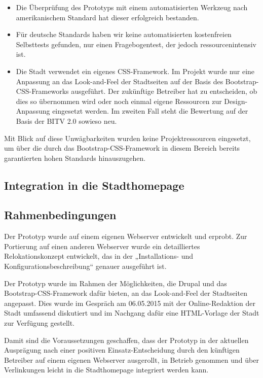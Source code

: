 \documentclass[11pt,a4paper,twoside]{article}
\begin{document}
\begin{itemize}\itemsep0pt
\item Die Überprüfung des Prototyps mit einem automatisierten Werkzeug nach
  amerikanischem Standard hat dieser erfolgreich bestanden.
\item Für deutsche Standards haben wir keine automatisierten kostenfreien
  Selbsttests gefunden, nur einen Fragebogentest, der jedoch
  ressourcenintensiv ist.
\item Die Stadt verwendet ein eigenes CSS-Framework. Im Projekt wurde nur eine
  Anpassung an das Look-and-Feel der Stadtseiten auf der Basis des
  Bootstrap-CSS-Frameworks ausgeführt.  Der zukünftige Betreiber hat zu
  entscheiden, ob dies so übernommen wird oder noch einmal eigene Ressourcen
  zur Design-Anpassung eingesetzt werden.  Im zweiten Fall steht die Bewertung
  auf der Basis der BITV 2.0 sowieso neu.
\end{itemize}
Mit Blick auf diese Unwägbarkeiten wurden keine Projektressourcen eingesetzt,
um über die durch das Bootstrap-CSS-Framework in diesem Bereich bereits
garantierten hohen Standards hinauszugehen.

\subsection{Integration in die Stadthomepage}

\subsection*{Rahmenbedingungen}

Der Prototyp wurde auf einem eigenen Webserver entwickelt und erprobt.  Zur
Portierung auf einen anderen Webserver wurde ein detailliertes
Relokationskonzept entwickelt, das in der „Installations- und
Konfigurationsbeschreibung“ genauer ausgeführt ist. 

Der Prototyp wurde im Rahmen der Möglichkeiten, die Drupal und das
Bootstrap-CSS-Framework dafür bieten, an das Look-and-Feel der Stadtseiten
angepasst. Dies wurde im Gespräch am 06.05.2015 mit der Online-Redaktion der
Stadt umfassend diskutiert und im Nachgang dafür eine HTML-Vorlage der Stadt
zur Verfügung gestellt.

Damit sind die Voraussetzungen geschaffen, dass der Prototyp in der aktuellen
Ausprägung nach einer positiven Einsatz-Entscheidung durch den künftigen
Betreiber auf einem eigenen Webserver ausgerollt, in Betrieb genommen und über
Verlinkungen leicht in die Stadthomepage integriert werden kann. 
\end{document}
